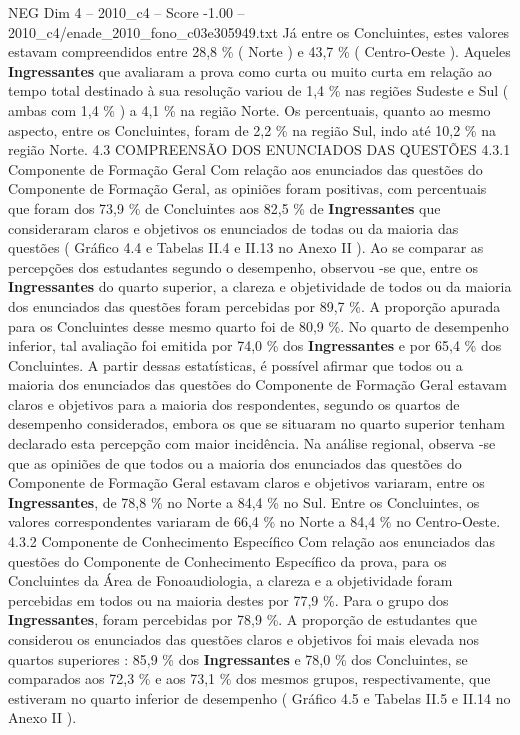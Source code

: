 \begin{textsample}{NEG Dim 4 – 2010\_c4 – Score -1.00 – 2010\_c4/enade\_2010\_fono\_c03e305949.txt}
Já entre os Concluintes, estes valores estavam compreendidos entre 28,8 \% ( Norte ) e 43,7 \% ( Centro-Oeste ).
Aqueles \textbf{Ingressantes} que avaliaram a prova como curta ou muito curta em relação ao tempo total destinado à sua resolução variou de 1,4 \% nas regiões Sudeste e Sul ( ambas com 1,4 \% ) a 4,1 \% na região Norte.
Os percentuais, quanto ao mesmo aspecto, entre os Concluintes, foram de 2,2 \% na região Sul, indo até 10,2 \% na região Norte. 4.3 COMPREENSÃO DOS ENUNCIADOS DAS QUESTÕES 4.3.1 Componente de Formação Geral Com relação aos enunciados das questões do Componente de Formação Geral, as opiniões foram positivas, com percentuais que foram dos 73,9 \% de Concluintes aos 82,5 \% de \textbf{Ingressantes} que consideraram claros e objetivos os enunciados de todas ou da maioria das questões ( Gráfico 4.4 e Tabelas II.4 e II.13 no Anexo II ).
Ao se comparar as percepções dos estudantes segundo o desempenho, observou -se que, entre os \textbf{Ingressantes} do quarto superior, a clareza e objetividade de todos ou da maioria dos enunciados das questões foram percebidas por 89,7 \%.
A proporção apurada para os Concluintes desse mesmo quarto foi de 80,9 \%.
No quarto de desempenho inferior, tal avaliação foi emitida por 74,0 \% dos \textbf{Ingressantes} e por 65,4 \% dos Concluintes.
A partir dessas estatísticas, é possível afirmar que todos ou a maioria dos enunciados das questões do Componente de Formação Geral estavam claros e objetivos para a maioria dos respondentes, segundo os quartos de desempenho considerados, embora os que se situaram no quarto superior tenham declarado esta percepção com maior incidência.
Na análise regional, observa -se que as opiniões de que todos ou a maioria dos enunciados das questões do Componente de Formação Geral estavam claros e objetivos variaram, entre os \textbf{Ingressantes}, de 78,8 \% no Norte a 84,4 \% no Sul.
Entre os Concluintes, os valores correspondentes variaram de 66,4 \% no Norte a 84,4 \% no Centro-Oeste. 4.3.2 Componente de Conhecimento Específico Com relação aos enunciados das questões do Componente de Conhecimento Específico da prova, para os Concluintes da Área de Fonoaudiologia, a clareza e a objetividade foram percebidas em todos ou na maioria destes por 77,9 \%.
Para o grupo dos \textbf{Ingressantes}, foram percebidas por 78,9 \%.
A proporção de estudantes que considerou os enunciados das questões claros e objetivos foi mais elevada nos quartos superiores : 85,9 \% dos \textbf{Ingressantes} e 78,0 \% dos Concluintes, se comparados aos 72,3 \% e aos 73,1 \% dos mesmos grupos, respectivamente, que estiveram no quarto inferior de desempenho ( Gráfico 4.5 e Tabelas II.5 e II.14 no Anexo II ).

\end{textsample}
